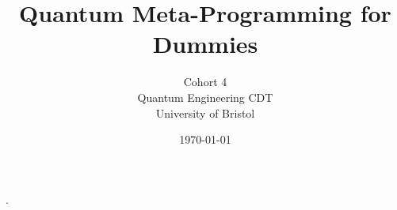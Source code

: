 \documentclass[12pt]{article}
\begin{document}
\title{Quantum Meta-Programming for Dummies}
    \author{Cohort 4 \\[0.5em] Quantum Engineering CDT \\ University of Bristol}
    \date{\today}
    \maketitle




\tableofcontents
\newpage






\newpage
.
\newpage


\newpage












\end{document}
